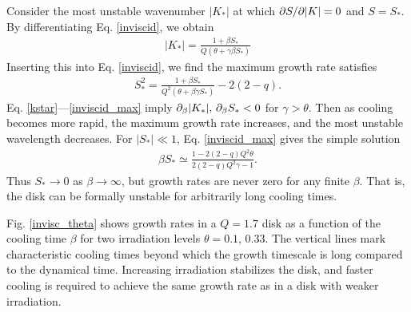 Consider the most unstable wavenumber $|K_*|$ at which $\partial S/\partial|K| =
0$ and $S = S_*$. By differentiating Eq. \ref{inviscid}, we obtain 
\begin{align}\label{kstar}
  |K_*| = \frac{1+\beta S_*}{Q\left(\theta + \gamma \beta S_*\right)}
\end{align}
Inserting this into Eq. \ref{inviscid}, we find the maximum growth
rate satisfies
\begin{align}\label{inviscid_max}
  S_*^2 = \frac{1+\beta S_*}{Q^2\left(\theta + \beta\gamma S_*\right)}
  - 2(2-q).
\end{align}
Eq. \ref{kstar}---\ref{inviscid_max} imply $\partial_\beta|K_*|,\,\partial_\beta
S_*<0 $ for $\gamma>\theta$. Then as cooling becomes more rapid, the maximum 
growth rate increases, and the most unstable wavelength decreases. 
For $|S_*|\ll1$, Eq. \ref{inviscid_max} gives the simple solution 
\begin{align}
  \beta S_*\simeq \frac{1-2(2-q)Q^2\theta}{2(2-q)Q^2\gamma-1}.  
\end{align} 
Thus $S_*\to0$ as $\beta\to\infty$, but growth rates are never zero
for any finite $\beta$. That is, the disk can be formally unstable for
arbitrarily long cooling times.       

Fig. \ref{invisc_theta} shows growth rates in a $Q=1.7$ disk  
as a function of the cooling time $\beta$ for two irradiation levels
$\theta=0.1,\,0.33$. The vertical lines mark characteristic cooling
times beyond which the growth timescale is long compared to the
dynamical time. Increasing irradiation stabilizes the
disk, and faster cooling is required to achieve the same growth 
rate as in a disk with weaker irradiation.  

